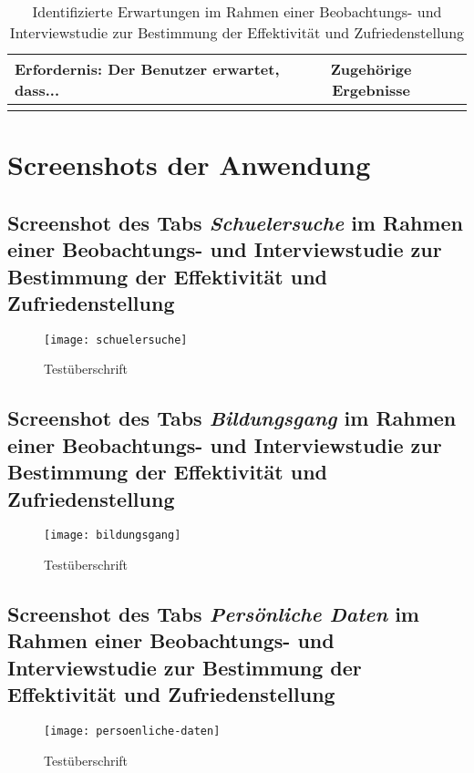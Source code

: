 \begin{landscape}
\begin{longtable}{p{15cm}cc}
    \caption{Identifizierte Erwartungen im Rahmen einer Beobachtungs- und Interviewstudie zur Bestimmung der Effektivität und Zufriedenstellung} \label{tab:mytable} \\
    \toprule
    Erfordernis: Der Benutzer erwartet, dass... & Zugehörige Ergebnisse \\
    \midrule
    \bottomrule
    \endfoot
    \label{tab:erwartungen}
\end{longtable}


\section{Screenshots der Anwendung}
    \subsection{Screenshot des Tabs \textit{Schuelersuche} im Rahmen einer Beobachtungs- und Interviewstudie zur Bestimmung der Effektivität und Zufriedenstellung}
    \label{section-schuelersuche}
    \begin{figure}[H]
        \centering
        \caption{Testüberschrift}
        \begin{adjustbox}{width=\linewidth, center}
            \texttt{[image: schuelersuche]}
        \end{adjustbox}
    \end{figure}

    \subsection{Screenshot des Tabs \textit{Bildungsgang} im Rahmen einer Beobachtungs- und Interviewstudie zur Bestimmung der Effektivität und Zufriedenstellung}
    \label{section-bildungsgang}
    \begin{figure}[H]
        \centering
        \caption{Testüberschrift}
        \begin{adjustbox}{width=\linewidth, center}
            \texttt{[image: bildungsgang]}
        \end{adjustbox}
    \end{figure}

    \subsection{Screenshot des Tabs \textit{Persönliche Daten} im Rahmen einer Beobachtungs- und Interviewstudie zur Bestimmung der Effektivität und Zufriedenstellung}
    \label{section-persoenliche-daten}
    \begin{figure}[H]
        \centering
        \caption{Testüberschrift}
        \begin{adjustbox}{width=\linewidth, center}
            \texttt{[image: persoenliche-daten]}
        \end{adjustbox}
    \end{figure}


\end{landscape}
